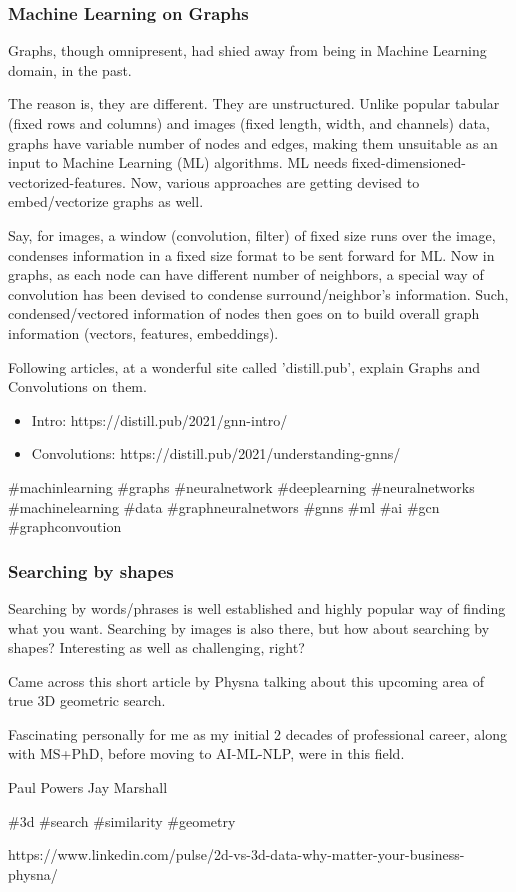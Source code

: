 \begin{frame}[fragile]\frametitle{Machine Learning on Graphs}

Graphs, though omnipresent, had shied away from being in Machine Learning domain, in the past.

The reason is, they are different. They are unstructured. Unlike popular tabular (fixed rows and columns) and images (fixed length, width, and channels) data, graphs have variable number of nodes and edges, making them unsuitable as an input to Machine Learning (ML) algorithms. ML needs fixed-dimensioned-vectorized-features. Now, various approaches are getting devised to embed/vectorize graphs as well.

Say, for images, a window (convolution, filter) of fixed size runs over the image, condenses information in a fixed size format to be sent forward for ML. Now in graphs, as each node can have different number of neighbors, a special way of convolution has been devised to condense surround/neighbor’s information. Such, condensed/vectored information of nodes then goes on to build overall graph information (vectors, features, embeddings).

Following articles, at a wonderful site called 'distill.pub', explain Graphs and Convolutions on them.

				\begin{itemize}
				\item Intro: https://distill.pub/2021/gnn-intro/
				\item Convolutions: https://distill.pub/2021/understanding-gnns/
				\end{itemize}

\#machinlearning \#graphs \#neuralnetwork \#deeplearning \#neuralnetworks \#machinelearning \#data \#graphneuralnetwors \#gnns \#ml \#ai \#gcn \#graphconvoution

\end{frame}


\begin{frame}[fragile]\frametitle{Searching by shapes}

Searching by words/phrases is well established and highly popular way of finding what you want. Searching by images is also there, but how about searching by shapes? Interesting as well as challenging, right?

Came across this short article by Physna talking about this upcoming area of true 3D geometric search.

Fascinating personally for me as my initial 2 decades of professional career, along with MS+PhD, before moving to AI-ML-NLP, were in this field.

Paul Powers Jay Marshall

\#3d \#search \#similarity \#geometry

https://www.linkedin.com/pulse/2d-vs-3d-data-why-matter-your-business-physna/

\end{frame}


